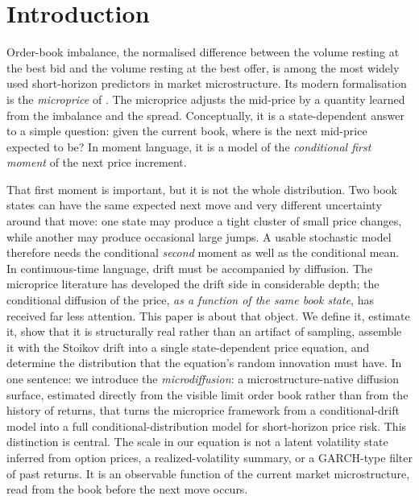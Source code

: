 \documentclass[11pt]{article}
\theoremstyle{plain}
\theoremstyle{definition}
\begin{document}
\clearpage
\section{Introduction}
\label{sec:intro}

Order-book imbalance, the normalised difference between the volume resting at the
best bid and the volume resting at the best offer, is among the most widely used
short-horizon predictors in market microstructure. Its modern formalisation is the
\emph{microprice} of \citet{stoikov2018}. The microprice adjusts the mid-price by a
quantity learned from the imbalance and the spread. Conceptually, it is a
state-dependent answer to a simple question: given the current book, where is the
next mid-price expected to be? In moment language, it is a model of the
\emph{conditional first moment} of the next price increment.

That first moment is important, but it is not the whole distribution. Two book
states can have the same expected next move and very different uncertainty around
that move: one state may produce a tight cluster of small price changes, while
another may produce occasional large jumps. A usable stochastic model therefore
needs the conditional \emph{second} moment as well as the conditional mean. In
continuous-time language, drift must be accompanied by diffusion. The microprice
literature has developed the drift side in considerable depth; the conditional
diffusion of the price, \emph{as a function of the same book state}, has received
far less attention. This paper is about that object. We define it, estimate it,
show that it is structurally real rather than an artifact of sampling, assemble it
with the Stoikov drift into a single state-dependent price equation, and determine
the distribution that the equation's random innovation must have. In one sentence:
we introduce the \emph{microdiffusion}: a microstructure-native diffusion surface,
estimated directly from the visible limit order book rather than from the history of
returns, that turns the microprice framework from a conditional-drift model into a
full conditional-distribution model for short-horizon price risk.
This distinction is central. The scale in our equation is not a latent volatility
state inferred from option prices, a realized-volatility summary, or a GARCH-type
filter of past returns. It is an observable function of the current market
microstructure, read from the book before the next move occurs.
\end{document}
